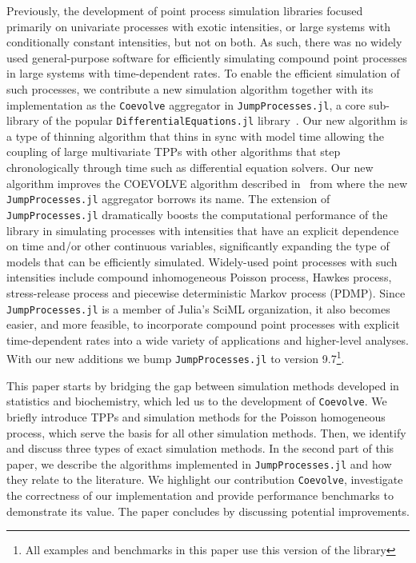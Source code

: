 \documentclass{juliacon}
\numberwithin{equation}{section}
\begin{document}
Previously, the development of point process simulation libraries focused primarily on univariate processes with exotic intensities, or large systems with conditionally constant intensities, but not on both. As such, there was no widely used general-purpose software for efficiently simulating compound point processes in large systems with time-dependent rates. To enable the efficient simulation of such processes, we contribute a new simulation algorithm together with its implementation as the \texttt{Coevolve} aggregator in \texttt{JumpProcesses.jl}, a core sub-library of the popular \texttt{DifferentialEquations.jl} library~\cite{rackauckas2017}. Our new algorithm is a type of thinning algorithm that thins in sync with model time allowing the coupling of large multivariate TPPs with other algorithms that step chronologically through time such as differential equation solvers. Our new algorithm improves the COEVOLVE algorithm described in~\cite{farajtabar2017} from where the new \texttt{JumpProcesses.jl} aggregator borrows its name. The extension of \texttt{JumpProcesses.jl} dramatically boosts the computational performance of the library in simulating processes with intensities that have an explicit dependence on time and/or other continuous variables,  significantly expanding the type of models that can be efficiently simulated. Widely-used point processes with such intensities include compound inhomogeneous Poisson process, Hawkes process, stress-release process and piecewise deterministic Markov process (PDMP). Since \texttt{JumpProcesses.jl} is a member of Julia's SciML organization, it also becomes easier, and more feasible, to incorporate compound point processes with explicit time-dependent rates into a wide variety of applications and higher-level analyses. With our new additions we bump \texttt{JumpProcesses.jl} to version 9.7\footnote{All examples and benchmarks in this paper use this version of the library}.

This paper starts by bridging the gap between simulation methods developed in statistics and biochemistry, which led us to the development of \texttt{Coevolve}. We briefly introduce TPPs and simulation methods for the Poisson homogeneous process, which serve the basis for all other simulation methods. Then, we identify and discuss three types of exact simulation methods. In the second part of this paper, we describe the algorithms implemented in \texttt{JumpProcesses.jl} and how they relate to the literature. We highlight our contribution \texttt{Coevolve}, investigate the correctness of our implementation and provide performance benchmarks to demonstrate its value. The paper concludes by discussing potential improvements.
\end{document}

